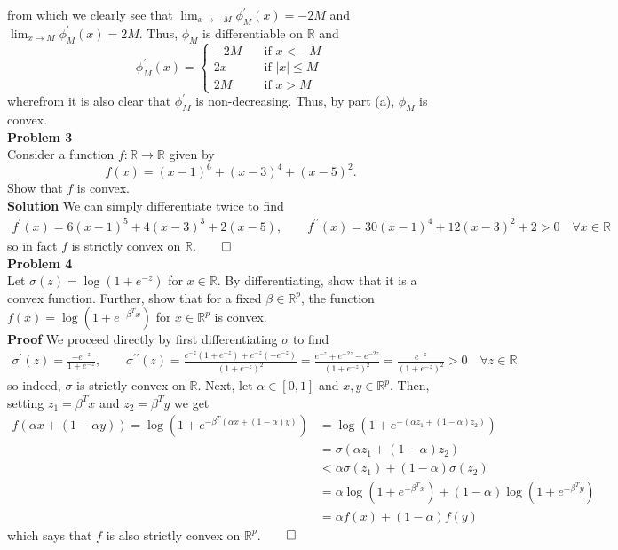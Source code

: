 \documentclass[10pt]{article}
\newcommand{\bp}[1]{\left({#1}\right)}
\newcommand{\mbb}[1]{\mathbb{#1}}
\newcommand{\1}[1]{\mathbbm{1}_{#1}}
\begin{document}
    from which we clearly see that $\lim_{x\rightarrow -M}\phi^\prime_M(x)=-2M$ and $\lim_{x\rightarrow M}\phi_M^\prime(x)=2M$. Thus, $\phi_M$ is differentiable on $\mbb{R}$ and 
    \[\phi_M^\prime(x)=\begin{cases}
        -2M\quad&\text{if $x<-M$}\\
        2x\quad&\text{if $|x|\leq M$}\\
        2M\quad&\text{if $x>M$}
    \end{cases}\]
    wherefrom it is also clear that $\phi^\prime_M$ is non-decreasing. Thus, by part (a), $\phi_M$ is convex.\\[5pt]
    {\bf Problem 3}\\[5pt]
    Consider a function $f:\mbb{R}\rightarrow\mbb{R}$ given by
    \[f(x)=(x-1)^6+(x-3)^4+(x-5)^2.\]
    Show that $f$ is convex.\\[5pt]
    {\bf Solution}\hspace{5pt} We can simply differentiate twice to find
    \begin{align*}
        f^\prime(x)=6(x-1)^5+4(x-3)^3+2(x-5),\qquad f^{\prime\prime}(x)=30(x-1)^4+12(x-3)^2+2>0\quad\forall x\in\mbb{R}
    \end{align*}
    so in fact $f$ is strictly convex on $\mbb{R}$.\hfill{$\qed$}\\[5pt]
    {\bf Problem 4}\\[5pt]
    Let $\sigma(z)=\log(1+e^{-z})$ for $x\in\mbb{R}$. By differentiating, show that it is a convex function. Further, show that for a fixed $\beta\in\mbb{R}^p$, the function
    $f(x)=\log(1+e^{-\beta^Tx})$ for $x\in\mbb{R}^p$ is convex.\\[5pt]
    {\bf Proof}\hspace{5pt} We proceed directly by first differentiating $\sigma$ to find
    \begin{align*}
        \sigma^\prime(z)=\frac{-e^{-z}}{1+e^{-z}},\qquad \sigma^{\prime\prime}(z)=\frac{e^{-z}(1+e^{-z})+e^{-z}(-e^{-z})}{(1+e^{-z})^2}=\frac{e^{-z}+e^{-2z}-e^{-2z}}{(1+e^{-z})^2}=\frac{e^{-z}}{(1+e^{-z})^2}>0\quad\forall z\in\mbb{R}
    \end{align*}
    so indeed, $\sigma$ is strictly convex on $\mbb{R}$. Next, let $\alpha\in[0,1]$ and $x,y\in\mbb{R}^p$. Then, setting $z_1=\beta^Tx$ and $z_2=\beta^Ty$ we get
    \begin{align*}
        f(\alpha x+(1-\alpha y))=\log\bp{1+e^{-\beta^T(\alpha x+(1-\alpha)y)}}&=\log\bp{1+e^{-(\alpha z_1+(1-\alpha)z_2)}}\\
        &=\sigma(\alpha z_1+(1-\alpha)z_2)\\
        &<\alpha\sigma(z_1)+(1-\alpha)\sigma(z_2)\tag{since $\sigma$ strictly convex}\\
        &=\alpha\log\bp{1+e^{-\beta^Tx}}+(1-\alpha)\log\bp{1+e^{-\beta^Ty}}\\
        &=\alpha f(x)+(1-\alpha)f(y)
    \end{align*}
    which says that $f$ is also strictly convex on $\mbb{R}^p$.\hfill{$\qed$}
\end{document}
